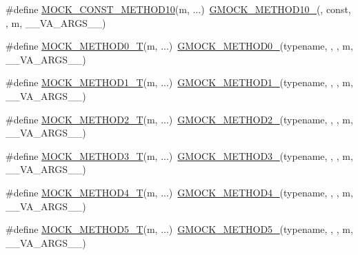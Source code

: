 \begin{DoxyCompactItemize}
\item 
\#define \mbox{\hyperlink{gmock-generated-function-mockers_8h_a4f16ede0ef660fb6dc49e5f5d226fbf9}{M\+O\+C\+K\+\_\+\+C\+O\+N\+S\+T\+\_\+\+M\+E\+T\+H\+O\+D10}}(m, ...)~\mbox{\hyperlink{gmock-generated-function-mockers_8h_a81a48223a8771de36ef92ac6d56f6e81}{G\+M\+O\+C\+K\+\_\+\+M\+E\+T\+H\+O\+D10\+\_\+}}(, const, , m, \+\_\+\+\_\+\+V\+A\+\_\+\+A\+R\+G\+S\+\_\+\+\_\+)
\item 
\#define \mbox{\hyperlink{gmock-generated-function-mockers_8h_a55a5a1a22cec416ead5605a2da39eec8}{M\+O\+C\+K\+\_\+\+M\+E\+T\+H\+O\+D0\+\_\+T}}(m, ...)~\mbox{\hyperlink{gmock-generated-function-mockers_8h_ae0d290ffa58d7c624b2e3487ba1252f4}{G\+M\+O\+C\+K\+\_\+\+M\+E\+T\+H\+O\+D0\+\_\+}}(typename, , , m, \+\_\+\+\_\+\+V\+A\+\_\+\+A\+R\+G\+S\+\_\+\+\_\+)
\item 
\#define \mbox{\hyperlink{gmock-generated-function-mockers_8h_a8e5b9539726be5c7a13f1aa3bcc1f29f}{M\+O\+C\+K\+\_\+\+M\+E\+T\+H\+O\+D1\+\_\+T}}(m, ...)~\mbox{\hyperlink{gmock-generated-function-mockers_8h_a1bc0012d62440dda77208dabdf4925c9}{G\+M\+O\+C\+K\+\_\+\+M\+E\+T\+H\+O\+D1\+\_\+}}(typename, , , m, \+\_\+\+\_\+\+V\+A\+\_\+\+A\+R\+G\+S\+\_\+\+\_\+)
\item 
\#define \mbox{\hyperlink{gmock-generated-function-mockers_8h_adb6e8d8bd6ab614c62d8ecc2ec163e3c}{M\+O\+C\+K\+\_\+\+M\+E\+T\+H\+O\+D2\+\_\+T}}(m, ...)~\mbox{\hyperlink{gmock-generated-function-mockers_8h_a885295ca6bebb15efb3fc786218c5d47}{G\+M\+O\+C\+K\+\_\+\+M\+E\+T\+H\+O\+D2\+\_\+}}(typename, , , m, \+\_\+\+\_\+\+V\+A\+\_\+\+A\+R\+G\+S\+\_\+\+\_\+)
\item 
\#define \mbox{\hyperlink{gmock-generated-function-mockers_8h_a0b1576f68e6161f106e3d9ee7e3ac28b}{M\+O\+C\+K\+\_\+\+M\+E\+T\+H\+O\+D3\+\_\+T}}(m, ...)~\mbox{\hyperlink{gmock-generated-function-mockers_8h_af7c77ba511c631de02bb8c45a6ed3045}{G\+M\+O\+C\+K\+\_\+\+M\+E\+T\+H\+O\+D3\+\_\+}}(typename, , , m, \+\_\+\+\_\+\+V\+A\+\_\+\+A\+R\+G\+S\+\_\+\+\_\+)
\item 
\#define \mbox{\hyperlink{gmock-generated-function-mockers_8h_a17dde4ac8109f0bf1b73e3509e42c879}{M\+O\+C\+K\+\_\+\+M\+E\+T\+H\+O\+D4\+\_\+T}}(m, ...)~\mbox{\hyperlink{gmock-generated-function-mockers_8h_ab6430f2cfad9de4aca5258ea559294bb}{G\+M\+O\+C\+K\+\_\+\+M\+E\+T\+H\+O\+D4\+\_\+}}(typename, , , m, \+\_\+\+\_\+\+V\+A\+\_\+\+A\+R\+G\+S\+\_\+\+\_\+)
\item 
\#define \mbox{\hyperlink{gmock-generated-function-mockers_8h_a3566f9bd057c5cee1841f55cbf685947}{M\+O\+C\+K\+\_\+\+M\+E\+T\+H\+O\+D5\+\_\+T}}(m, ...)~\mbox{\hyperlink{gmock-generated-function-mockers_8h_a9e3ecd392499ab19a4a6d3adcabf56f6}{G\+M\+O\+C\+K\+\_\+\+M\+E\+T\+H\+O\+D5\+\_\+}}(typename, , , m, \+\_\+\+\_\+\+V\+A\+\_\+\+A\+R\+G\+S\+\_\+\+\_\+)

\end{DoxyCompactItemize}
